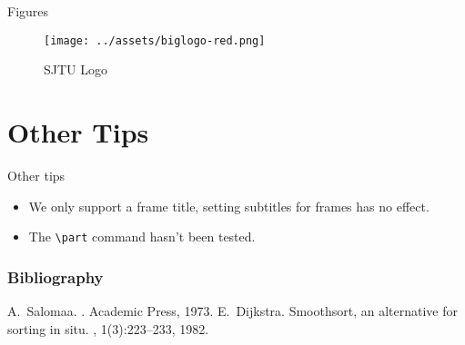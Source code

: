 \documentclass[no-math, aspectratio=1610, 10pt]{beamer}
\begin{document}
    \begin{frame}{Figures}
        \begin{figure}
            \texttt{[image: ../assets/biglogo-red.png]}
            \caption{SJTU Logo}
        \end{figure}
    \end{frame}

    \section{Other Tips}

    \begin{frame}[fragile]{Other tips}
        \begin{itemize}
            \item We only support a frame title, setting subtitles for frames has no effect.
            \item The \verb|\part| command hasn't been tested.
        \end{itemize}
    \end{frame}

    \begin{frame}
        \frametitle{Bibliography}
        \begin{thebibliography}{Dijkstra, 1982}
          A.~Salomaa.
          .
          \newblock Academic Press, 1973.
          E.~Dijkstra.
          \newblock Smoothsort, an alternative for sorting in situ.
          , 1(3):223--233, 1982.
        \end{thebibliography}
      \end{frame}
\end{document}
